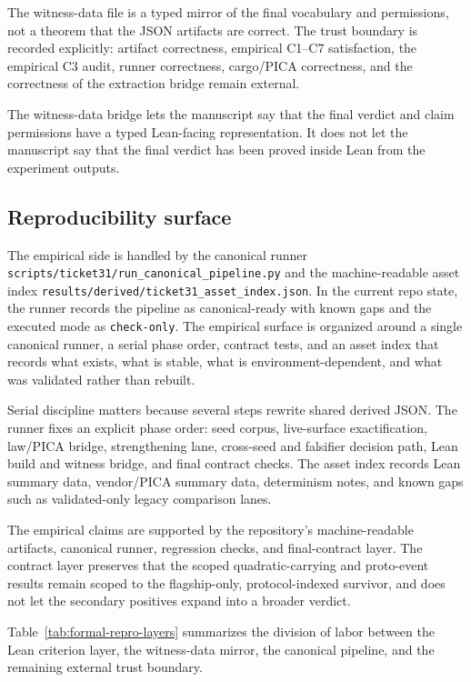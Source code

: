 \documentclass[11pt]{article}
\theoremstyle{definition}
\begin{document}
The witness-data file is a typed mirror of the final vocabulary and permissions, not
a theorem that the JSON artifacts are correct. The trust boundary is recorded
explicitly: artifact correctness, empirical C1--C7 satisfaction, the empirical C3
audit, runner correctness, cargo/PICA correctness, and the correctness of the
extraction bridge remain external.

The witness-data bridge lets the manuscript say that the final verdict and claim
permissions have a typed Lean-facing representation. It does not let the manuscript
say that the final verdict has been proved inside Lean from the experiment outputs.

\subsection{Reproducibility surface}

The empirical side is handled by the canonical runner
\nolinkurl{scripts/ticket31/run_canonical_pipeline.py} and the machine-readable asset
index \nolinkurl{results/derived/ticket31_asset_index.json}. In the current repo
state, the runner records the pipeline as canonical-ready with known gaps and the
executed mode as \texttt{check-only}.
The empirical surface is organized around a single canonical runner, a serial phase
order, contract tests, and an asset index that records what exists, what is stable,
what is environment-dependent, and what was validated rather than rebuilt.

Serial discipline matters because several steps rewrite shared derived JSON. The
runner fixes an explicit phase order: seed corpus, live-surface exactification,
law/PICA bridge, strengthening lane, cross-seed and falsifier decision path, Lean
build and witness bridge, and final contract checks. The asset index records Lean
summary data, vendor/PICA summary data, determinism notes, and known gaps such as
validated-only legacy comparison lanes.

The empirical claims are supported by the repository's machine-readable artifacts,
canonical runner, regression checks, and final-contract layer. The contract layer
preserves that the scoped quadratic-carrying and proto-event results remain scoped to
the flagship-only, protocol-indexed survivor, and does not let the secondary positives
expand into a broader verdict.

Table~\ref{tab:formal-repro-layers} summarizes the division of labor between the Lean
criterion layer, the witness-data mirror, the canonical pipeline, and the remaining
external trust boundary.
\end{document}
